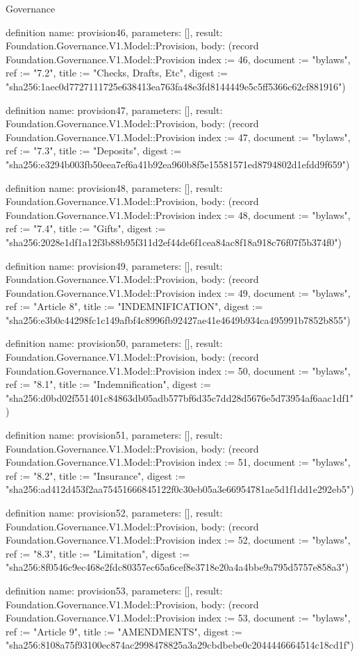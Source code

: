 \begin{lexlean}{Governance}
\begin{semanticmodule}
definition{
  name: provision46,
  parameters: [],
  result: Foundation.Governance.V1.Model::Provision,
  body: (record Foundation.Governance.V1.Model::Provision {index := 46, document := "bylaws", ref := "7.2", title := "Checks, Drafts, Etc", digest := "sha256:1aec0d7727111725e638413ea763fa48e3fd8144449e5c5ff5366c62cf881916"})
}

definition{
  name: provision47,
  parameters: [],
  result: Foundation.Governance.V1.Model::Provision,
  body: (record Foundation.Governance.V1.Model::Provision {index := 47, document := "bylaws", ref := "7.3", title := "Deposits", digest := "sha256:e3294b003fb50eea7ef6a41b92ea960b8f5e15581571ed8794802d1efdd9f659"})
}

definition{
  name: provision48,
  parameters: [],
  result: Foundation.Governance.V1.Model::Provision,
  body: (record Foundation.Governance.V1.Model::Provision {index := 48, document := "bylaws", ref := "7.4", title := "Gifts", digest := "sha256:2028e1df1a12f3b88b95f311d2ef44de6f1cea84ac8f18a918c76f07f5b374f0"})
}

definition{
  name: provision49,
  parameters: [],
  result: Foundation.Governance.V1.Model::Provision,
  body: (record Foundation.Governance.V1.Model::Provision {index := 49, document := "bylaws", ref := "Article 8", title := "INDEMNIFICATION", digest := "sha256:e3b0c44298fc1c149afbf4c8996fb92427ae41e4649b934ca495991b7852b855"})
}

definition{
  name: provision50,
  parameters: [],
  result: Foundation.Governance.V1.Model::Provision,
  body: (record Foundation.Governance.V1.Model::Provision {index := 50, document := "bylaws", ref := "8.1", title := "Indemnification", digest := "sha256:d0bd02f551401c84863db05adb577bf6d35c7dd28d5676e5d73954af6aac1df1"})
}

definition{
  name: provision51,
  parameters: [],
  result: Foundation.Governance.V1.Model::Provision,
  body: (record Foundation.Governance.V1.Model::Provision {index := 51, document := "bylaws", ref := "8.2", title := "Insurance", digest := "sha256:ad412d453f2aa75451666845122f0c30eb05a3e66954781ae5d1f1dd1e292eb5"})
}

definition{
  name: provision52,
  parameters: [],
  result: Foundation.Governance.V1.Model::Provision,
  body: (record Foundation.Governance.V1.Model::Provision {index := 52, document := "bylaws", ref := "8.3", title := "Limitation", digest := "sha256:8f0546c9ec468e2fdc80357ec65a6cef8e3718e20a4a4bbe9a795d5757e858a3"})
}

definition{
  name: provision53,
  parameters: [],
  result: Foundation.Governance.V1.Model::Provision,
  body: (record Foundation.Governance.V1.Model::Provision {index := 53, document := "bylaws", ref := "Article 9", title := "AMENDMENTS", digest := "sha256:8108a75f93100ec874ac2998478825a3a29cbdbebe0c2044446664514c18cd1f"})
}


\end{semanticmodule}
\end{lexlean}
